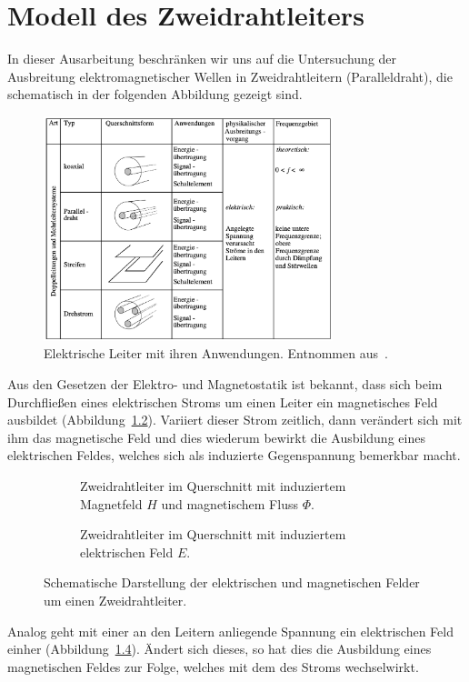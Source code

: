 \documentclass[paper=a4, parskip=half-, ngerman, fontsize=11pt]{scrreprt}
\begin{document}
\chapter{Modell des Zweidrahtleiters}

In dieser Ausarbeitung beschränken wir uns auf die Untersuchung der Ausbreitung elektromagnetischer Wellen in
Zweidrahtleitern (Paralleldraht), die schematisch in der folgenden Abbildung gezeigt sind.
\begin{figure}[!htb]
    \begin{center}
        \includegraphics[width=0.75\textwidth]{images/Leiter.png}
        \caption{Elektrische Leiter mit ihren Anwendungen. Entnommen aus~\cite{FernuniSkript}.}
        \label{Leiter}
    \end{center}
\end{figure}

Aus den Gesetzen der Elektro- und Magnetostatik ist bekannt, dass sich beim Durchfließen eines elektrischen Stroms um
einen Leiter ein magnetisches Feld ausbildet (Abbildung~\ref{Felder1}). Variiert dieser Strom zeitlich, dann
verändert sich mit ihm das magnetische Feld und dies wiederum bewirkt die Ausbildung eines elektrischen Feldes, welches
sich als induzierte Gegenspannung bemerkbar macht.
\begin{figure}[!htb]
    \begin{subfigure}[t]{0.49\textwidth}
        \centering
        
        \caption{Zweidrahtleiter im Querschnitt mit induziertem Magnetfeld $H$ und magnetischem Fluss $\Phi$.}
        \label{Felder1}
    \end{subfigure}%
    \hfill
    \begin{subfigure}[t]{0.49\textwidth}
        \centering
        
        \caption{Zweidrahtleiter im Querschnitt mit induziertem elektrischen Feld $E$.}
        \label{Felder2}
    \end{subfigure}
    \caption{Schematische Darstellung der elektrischen und magnetischen Felder um einen Zweidrahtleiter.}
\end{figure}
Analog geht mit einer an den Leitern anliegende Spannung ein elektrischen Feld einher (Abbildung~\ref{Felder2}).
Ändert sich dieses, so hat dies die Ausbildung eines magnetischen Feldes zur Folge, welches mit dem des Stroms
wechselwirkt.
\end{document}
